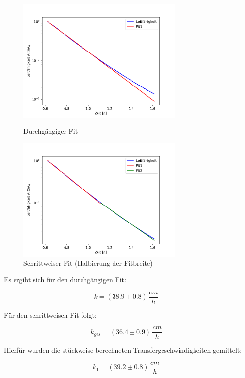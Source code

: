 \documentclass[12pt]{article}
\begin{document}
\begin{figure}[H]
	\centering
	\parbox{82.5mm}{
		\centering
		\includegraphics[width=82.5mm]{VE-Wasser/TransferGeschw}
		\caption{Durchgängiger Fit}
	}
	\hfill%
	\parbox{82.5mm}{
		\centering
		\includegraphics[width=82.5mm]{VE-Wasser/TransferGeschwKnick}
		\caption{Schrittweiser Fit (Halbierung der Fitbreite)}
	}
\end{figure}

 Es ergibt sich für den durchgängigen Fit:

\begin{equation}
	k = (38.9 \pm 0.8)\, \frac{cm}{h}
\end{equation}

Für den schrittweisen Fit folgt:

\begin{equation}
k_{ges} = (36.4 \pm 0.9)\, \frac{cm}{h}
\end{equation}

Hierfür wurden die stückweise berechneten Transfergeschwindigkeiten gemittelt:

\begin{equation}
k_1 = (39.2 \pm 0.8)\, \frac{cm}{h}
\end{equation}
\end{document}
